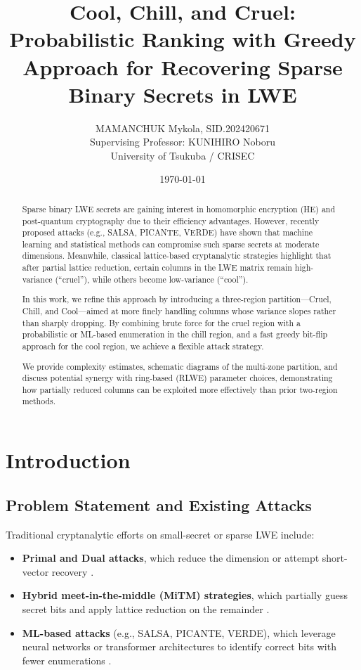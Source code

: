 \documentclass[11pt]{article}
\title{Cool, Chill, and Cruel: Probabilistic Ranking with Greedy Approach for Recovering Sparse Binary Secrets in LWE}
\author{MAMANCHUK Mykola, SID.202420671 \\ Supervising Professor: KUNIHIRO Noboru \\ \small{University of Tsukuba / CRISEC}}
\date{\today}
\begin{document}
\maketitle

\begin{abstract}
  Sparse binary LWE secrets are gaining interest in homomorphic encryption (HE) and post-quantum cryptography due to their efficiency advantages. However, recently proposed attacks (e.g., SALSA, PICANTE, VERDE) have shown that machine learning and statistical methods can compromise such sparse secrets at moderate dimensions. Meanwhile, classical lattice-based cryptanalytic strategies highlight that after partial lattice reduction, certain columns in the LWE matrix remain high-variance (“cruel”), while others become low-variance (“cool”). 
  
  In this work, we refine this approach by introducing a three-region partition—Cruel, Chill, and Cool—aimed at more finely handling columns whose variance slopes rather than sharply dropping. By combining brute force for the cruel region with a probabilistic or ML-based enumeration in the chill region, and a fast greedy bit-flip approach for the cool region, we achieve a flexible attack strategy. 
  
  We provide complexity estimates, schematic diagrams of the multi-zone partition, and discuss potential synergy with ring-based (RLWE) parameter choices, demonstrating how partially reduced columns can be exploited more effectively than prior two-region methods.
  \end{abstract}
  
  \section{Introduction}

  \subsection{Problem Statement and Existing Attacks}
  
  Traditional cryptanalytic efforts on small-secret or sparse LWE include:
  
  \begin{itemize}
      \item \textbf{Primal and Dual attacks}, which reduce the dimension or attempt short-vector recovery \cite{primal-dual}.
      \item \textbf{Hybrid meet-in-the-middle (MiTM) strategies}, which partially guess secret bits and apply lattice reduction on the remainder \cite{hybrid-mitm}.
      \item \textbf{ML-based attacks} (e.g., SALSA, PICANTE, VERDE), which leverage neural networks or transformer architectures to identify correct bits with fewer enumerations \cite{salsa, picante, salsa-verde}.
  \end{itemize}
  
\end{document}
